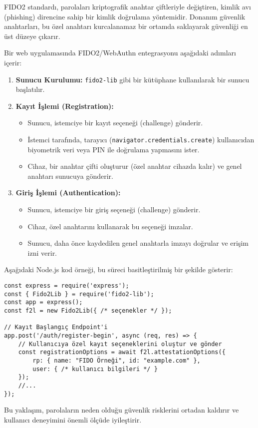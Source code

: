 FIDO2 standardı, parolaları kriptografik anahtar çiftleriyle değiştiren, kimlik avı (phishing) direncine sahip bir kimlik doğrulama yöntemidir. Donanım güvenlik anahtarları, bu özel anahtarı kurcalanamaz bir ortamda saklayarak güvenliği en üst düzeye çıkarır.

Bir web uygulamasında FIDO2/WebAuthn entegrasyonu aşağıdaki adımları içerir:

\begin{enumerate}
    \item \textbf{Sunucu Kurulumu:} \verb|fido2-lib| gibi bir kütüphane kullanılarak bir sunucu başlatılır.
    \item \textbf{Kayıt İşlemi (Registration):}
    \begin{itemize}
        \item Sunucu, istemciye bir kayıt seçeneği (challenge) gönderir.
        \item İstemci tarafında, tarayıcı (\verb|navigator.credentials.create|) kullanıcıdan biyometrik veri veya PIN ile doğrulama yapmasını ister.
        \item Cihaz, bir anahtar çifti oluşturur (özel anahtar cihazda kalır) ve genel anahtarı sunucuya gönderir.
    \end{itemize}
    \item \textbf{Giriş İşlemi (Authentication):}
    \begin{itemize}
        \item Sunucu, istemciye bir giriş seçeneği (challenge) gönderir.
        \item Cihaz, özel anahtarını kullanarak bu seçeneği imzalar.
        \item Sunucu, daha önce kaydedilen genel anahtarla imzayı doğrular ve erişim izni verir.
    \end{itemize}
\end{enumerate}
Aşağıdaki Node.js kod örneği, bu süreci basitleştirilmiş bir şekilde gösterir:
\begin{verbatim}
const express = require('express');
const { Fido2Lib } = require('fido2-lib');
const app = express();
const f2l = new Fido2Lib({ /* seçenekler */ });

// Kayıt Başlangıç Endpoint'i
app.post('/auth/register-begin', async (req, res) => {
    // Kullanıcıya özel kayıt seçeneklerini oluştur ve gönder
    const registrationOptions = await f2l.attestationOptions({
        rp: { name: "FIDO Örneği", id: "example.com" },
        user: { /* kullanıcı bilgileri */ }
    });
    //...
});
\end{verbatim}
Bu yaklaşım, parolaların neden olduğu güvenlik risklerini ortadan kaldırır ve kullanıcı deneyimini önemli ölçüde iyileştirir.

